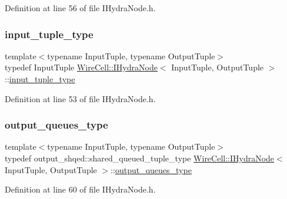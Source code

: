Definition at line 56 of file I\+Hydra\+Node.\+h.

\mbox{\label{class_wire_cell_1_1_i_hydra_node_a7dfb6628c7437769153669f61733b2a6}} 
\subsubsection{\texorpdfstring{input\+\_\+tuple\+\_\+type}{input\_tuple\_type}}
{\footnotesize\ttfamily template$<$typename Input\+Tuple, typename Output\+Tuple$>$ \\
typedef Input\+Tuple \hyperlink{class_wire_cell_1_1_i_hydra_node}{Wire\+Cell\+::\+I\+Hydra\+Node}$<$ Input\+Tuple, Output\+Tuple $>$\+::\hyperlink{class_wire_cell_1_1_i_hydra_node_a7dfb6628c7437769153669f61733b2a6}{input\+\_\+tuple\+\_\+type}}



Definition at line 53 of file I\+Hydra\+Node.\+h.

\mbox{\label{class_wire_cell_1_1_i_hydra_node_aeb800228236a385497609533fc0fe256}} 
\subsubsection{\texorpdfstring{output\+\_\+queues\+\_\+type}{output\_queues\_type}}
{\footnotesize\ttfamily template$<$typename Input\+Tuple, typename Output\+Tuple$>$ \\
typedef output\+\_\+shqed\+::shared\+\_\+queued\+\_\+tuple\+\_\+type \hyperlink{class_wire_cell_1_1_i_hydra_node}{Wire\+Cell\+::\+I\+Hydra\+Node}$<$ Input\+Tuple, Output\+Tuple $>$\+::\hyperlink{class_wire_cell_1_1_i_hydra_node_aeb800228236a385497609533fc0fe256}{output\+\_\+queues\+\_\+type}}



Definition at line 60 of file I\+Hydra\+Node.\+h.

\mbox{\label{class_wire_cell_1_1_i_hydra_node_abc72640e56a315146c504610302b1d8d}} 
